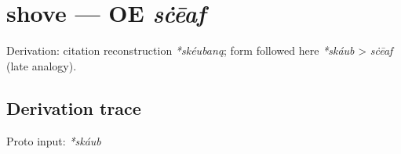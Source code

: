 \documentclass[
  british,
  a4paper,
  openany]{book}
\providecommand{\texorpdfstring}[2]{#1}
\begin{document}
\section{\texorpdfstring{shove --- OE
\emph{sċēaf}}{shove --- OE sċēaf}}\label{shove-oe-sux10bux113af}


Derivation: citation reconstruction \emph{*skéubaną}; form followed here
\emph{*skáub} \textgreater{} \emph{sċēaf} (late analogy).

\subsection{Derivation trace}\label{derivation-trace-123}

Proto input: \emph{*skáub}

\begingroup
\setlength{\fboxsep}{6pt}
\end{document}
